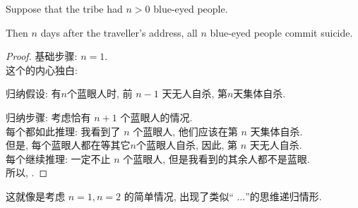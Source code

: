     \begin{theorem}
      Suppose that the tribe had $n > 0$ blue-eyed people. 
      
      Then $n$ days after the traveller's address, all $n$ blue-eyed people commit suicide.
    \end{theorem}

    \begin{proof}
      \item[基础步骤:] $n = 1$. \\ 
        这个的内心独白:  
      \item[归纳假设:] 有$n$个蓝眼人时, 前 $n-1$ 天无人自杀, 第$n$天集体自杀. 
      \item[归纳步骤:] 考虑恰有 $n+1$ 个蓝眼人的情况.   \\
        每个都如此推理: 我看到了 $n$ 个蓝眼人, 他们应该在第 $n$ 天集体自杀. 
         \\
        但是, 每个蓝眼人都在等其它$n$个蓝眼人自杀, 因此, 第 $n$ 天无人自杀. 
         \\
        每个继续推理: 一定不止 $n$ 个蓝眼人, 但是我看到的其余人都不是蓝眼. 
         \\
        所以, . 
    \end{proof}

    这就像是考虑 $n = 1, n = 2$ 的简单情况, 出现了类似`` $\dots$''的思维递归情形. 
    